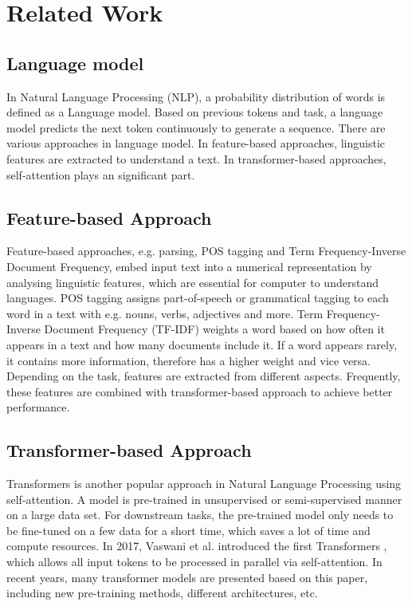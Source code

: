 \section{Related Work}
\label{sec:relatedwork}

\subsection*{Language model}

In Natural Language Processing (NLP), 
a probability distribution of words is defined as a Language model. 
Based on previous tokens and task, a language model predicts the next token continuously to generate a sequence. 
There are various approaches in language model. 
In feature-based approaches, linguistic features are extracted to understand a text. 
In transformer-based approaches, self-attention plays an significant part.

\subsection*{Feature-based Approach}

Feature-based approaches, e.g. parsing, POS tagging and Term Frequency-Inverse Document Frequency, 
embed input text into a numerical representation by analysing linguistic features, 
which are essential for computer to understand languages. 
POS tagging assigns part-of-speech or grammatical tagging to each word in a text with e.g. nouns, verbs, adjectives and more. 
Term Frequency-Inverse Document Frequency (TF-IDF) weights a word based on 
how often it appears in a text and how many documents include it. 
If a word appears rarely, it contains more information, therefore has a higher weight and vice versa. 
Depending on the task, features are extracted from different aspects. 
Frequently, these features are combined with transformer-based approach to achieve better performance.

\subsection*{Transformer-based Approach}

Transformers is another popular approach in Natural Language Processing using self-attention. 
A model is pre-trained in unsupervised or semi-supervised manner on a large data set. 
For downstream tasks, the pre-trained model only needs to be fine-tuned on a few data for a short time, 
which saves a lot of time and compute resources. 
In 2017, Vaswani et al. introduced the first Transformers \cite{Transformers}, 
which allows all input tokens to be processed in parallel via self-attention. 
In recent years, many transformer models are presented based on this paper, 
including new pre-training methods, different architectures, etc. 

